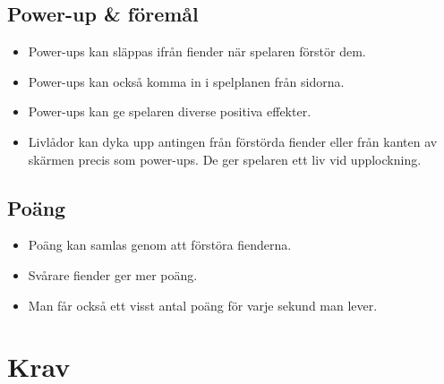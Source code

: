 \documentclass{TDP005mall}
\begin{document}
\subsection{Power-up \& föremål}
\begin{itemize}
\item Power-ups kan släppas ifrån fiender när spelaren förstör dem.
\item Power-ups kan också komma in i spelplanen från sidorna.
\item Power-ups kan ge spelaren diverse positiva effekter.
\item Livlådor kan dyka upp antingen från förstörda fiender eller från kanten av skärmen precis som power-ups. De ger spelaren ett liv vid upplockning. %
\end{itemize}

\subsection{Poäng}
\begin{itemize}
\item Poäng kan samlas genom att förstöra fienderna.
\item Svårare fiender ger mer poäng.
\item Man får också ett visst antal poäng för varje sekund man lever.
\end{itemize}


\section{Krav}
\end{document}
